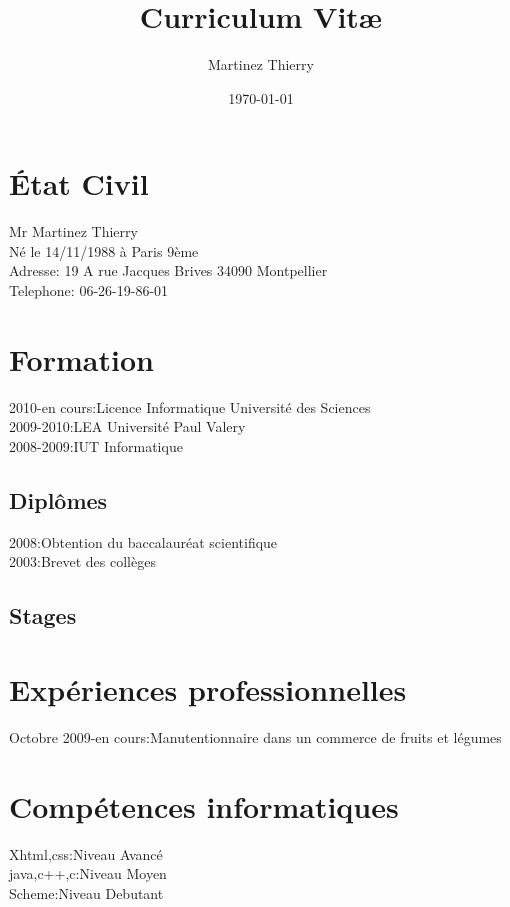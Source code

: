 \documentclass[a4paper]{article}
\title{Curriculum Vit\ae}
\author{Martinez Thierry}
\date{\today}
\begin{document}
\maketitle

\section{\'Etat Civil}
\begin{flushleft}Mr Martinez Thierry\\
Né le 14/11/1988 à Paris 9ème\\
Adresse: 19 A rue Jacques Brives 34090 Montpellier\\
Telephone: 06-26-19-86-01
\end{flushleft}
\section{Formation}
 \begin{flushleft}2010-en cours:Licence Informatique Université des Sciences\\
2009-2010:LEA Université Paul Valery\\
 2008-2009:IUT Informatique
\end{flushleft}
\subsection{Diplômes}
 \begin {flushleft} 2008:Obtention du baccalauréat scientifique
\\2003:Brevet des collèges
\end{flushleft}
\subsection{Stages}

\section{Expériences professionnelles}
 \begin{flushleft} Octobre 2009-en cours:Manutentionnaire dans un commerce de fruits et légumes\end{flushleft}

\section*{Compétences informatiques}
 \begin{flushleft} Xhtml,css:Niveau Avancé
\\java,c++,c:Niveau Moyen
\\Scheme:Niveau Debutant
\end{flushleft}
\end{document}
